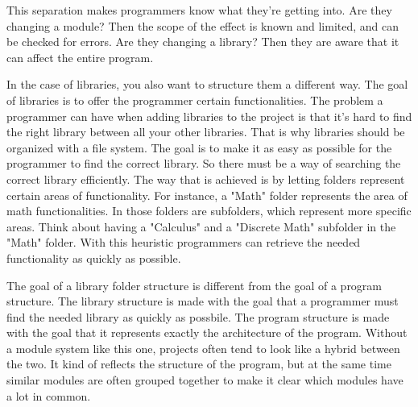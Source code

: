 \documentclass{article}
\begin{document}
This separation makes programmers know what they’re getting into. Are they changing a module? Then the scope of the effect is known and limited, and can be checked for errors. Are they changing a library? Then they are aware that it can affect the entire program.


In the case of libraries, you also want to structure them a different way. The goal of libraries is to offer the programmer certain functionalities. The problem a programmer can have when adding libraries to the project is that it's hard to find the right library between all your other libraries. That is why libraries should be organized with a file system. The goal is to make it as easy as possible for the programmer to find the correct library. So there must be a way of searching the correct library efficiently. The way that is achieved is by letting folders represent certain areas of functionality. For instance, a "Math" folder represents the area of math functionalities. In those folders are subfolders, which represent more specific areas. Think about having a "Calculus" and a "Discrete Math" subfolder in the "Math" folder. With this heuristic programmers can retrieve the needed functionality as quickly as possible.

The goal of a library folder structure is different from the goal of a program structure.
The library structure is made with the goal that a programmer must find the needed library as quickly as possbile.
The program structure is made with the goal that it represents exactly the architecture of the program.
Without a module system like this one, projects often tend to look like a hybrid between the two. It kind of reflects the structure of the program, but at the same time similar modules are often grouped together to make it clear which modules have a lot in common.
\end{document}

